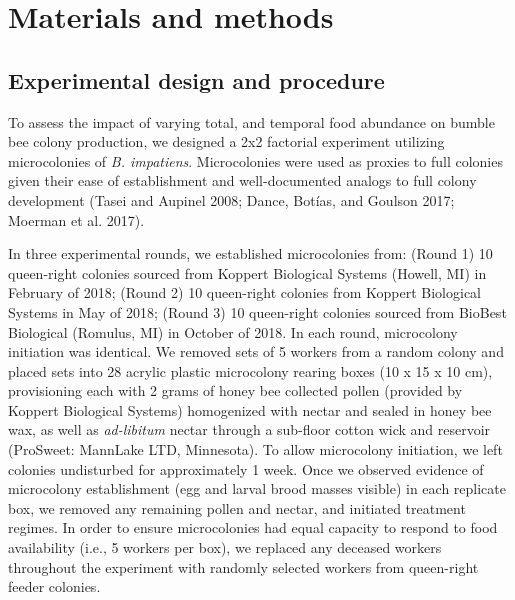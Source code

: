\documentclass[11pt,]{article}
\begin{document}
\hypertarget{materials-and-methods}{%
\section{Materials and methods}\label{materials-and-methods}}

\hypertarget{experimental-design-and-procedure}{%
\subsection{Experimental design and
procedure}\label{experimental-design-and-procedure}}

To assess the impact of varying total, and temporal food abundance on
bumble bee colony production, we designed a 2x2 factorial experiment
utilizing microcolonies of \emph{B. impatiens}. Microcolonies were used
as proxies to full colonies given their ease of establishment and
well-documented analogs to full colony development (Tasei and Aupinel
2008; Dance, Botías, and Goulson 2017; Moerman et al. 2017).

In three experimental rounds, we established microcolonies from: (Round
1) 10 queen-right colonies sourced from Koppert Biological Systems
(Howell, MI) in February of 2018; (Round 2) 10 queen-right colonies from
Koppert Biological Systems in May of 2018; (Round 3) 10 queen-right
colonies sourced from BioBest Biological (Romulus, MI) in October of
2018. In each round, microcolony initiation was identical. We removed
sets of 5 workers from a random colony and placed sets into 28 acrylic
plastic microcolony rearing boxes (10 x 15 x 10 cm), provisioning each
with 2 grams of honey bee collected pollen (provided by Koppert
Biological Systems) homogenized with nectar and sealed in honey bee wax,
as well as \emph{ad-libitum} nectar through a sub-floor cotton wick and
reservoir (ProSweet: MannLake LTD, Minnesota). To allow microcolony
initiation, we left colonies undisturbed for approximately 1 week. Once
we observed evidence of microcolony establishment (egg and larval brood
masses visible) in each replicate box, we removed any remaining pollen
and nectar, and initiated treatment regimes. In order to ensure
microcolonies had equal capacity to respond to food availability (i.e.,
5 workers per box), we replaced any deceased workers throughout the
experiment with randomly selected workers from queen-right feeder
colonies.
\end{document}
